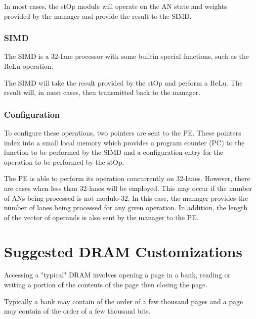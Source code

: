 \documentclass[journal]{IEEEtran}
\begin{document}
In most cases, the stOp module will operate on the AN state and weights provided by the manager and provide the result to the SIMD.
\subsubsection{SIMD}
\label{ssec:SIMD}

The SIMD is a 32-lane processor with some builtin special functions, such as the ReLu operation.

The SIMD will take the result provided by the stOp and perform a ReLu. The result will, in most cases, then transmitted back to the manager.

\subsubsection{Configuration}
\label{ssec:peConfiguration}

To configure these operations, two pointers are sent to the PE. These pointers index into a small local memory which provides a program counter (PC) to the function to be performed by the SIMD and a configuration entry for the operation to be performed by the stOp.

The PE is able to perform its operation concurrently on 32-lanes. However, there are cases when less than 32-lanes will be employed. This may occur if the number of ANs being processed is not modulo-32. In this case, the manager provides the number of lanes being processed for any given operation. In addition, the length of the vector of operands is also sent by the manager to the PE.

\section{Suggested DRAM Customizations}
\label{sec:Suggested DRAM Customizations}

Accessing a "typical" DRAM involves opening a page in a bank, reading or writing a portion of the contents of the page then closing the page.

Typically a bank may contain of the order of a few thousand pages and a page may contain of the order of a few thousand bits.
\end{document}
